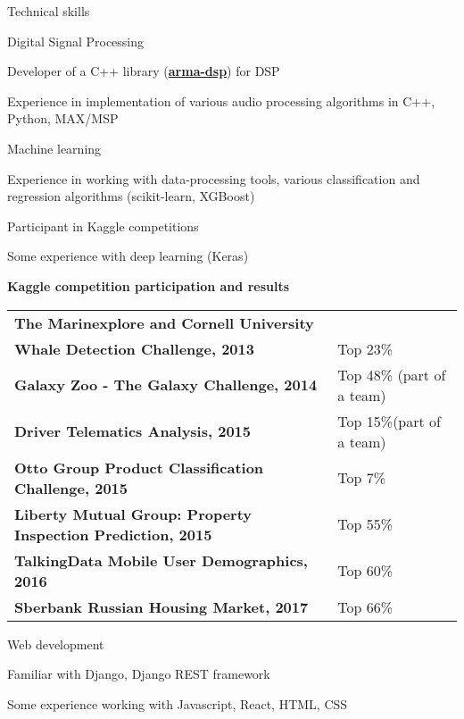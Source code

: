 \documentclass{resume} %
\begin{document}
\begin{rSection}{Technical skills}
\begin{rSubsection}{Digital Signal Processing}{}{}{}
\item Developer of a C++ library ({\bf \href{https://github.com/knstmrd/arma-dsp}{arma-dsp}}) for DSP
\item Experience in implementation of various audio processing algorithms in C++, Python, MAX/MSP
\end{rSubsection}

\begin{rSubsection}{Machine learning}{}{}{}
\item Experience in working with data-processing tools, various classification and regression algorithms (scikit-learn, XGBoost)
\item Participant in Kaggle competitions
\item Some experience with deep learning (Keras)
\end{rSubsection}

{\bf Kaggle competition participation and results}






\begin{tabular}{ @{} >{\bfseries}l @{\hspace{6ex}} l }

The Marinexplore and Cornell University & \\
Whale Detection Challenge, 2013 & Top 23\% \\
Galaxy Zoo - The Galaxy Challenge, 2014 & Top 48\% (part of a team) \\
Driver Telematics Analysis, 2015  & Top 15\%(part of a team) \\ 
Otto Group Product Classification Challenge, 2015 & Top 7\% \\ 
Liberty Mutual Group: Property Inspection Prediction, 2015 & Top 55\% \\
TalkingData Mobile User Demographics, 2016 & Top 60\% \\
Sberbank Russian Housing Market, 2017 & Top 66\%
\end{tabular}

\begin{rSubsection}{Web development}{}{}{}
\item Familiar with Django, Django REST framework
\item Some experience working with Javascript, React, HTML, CSS
\end{rSubsection}

\end{rSection}
\end{document}

